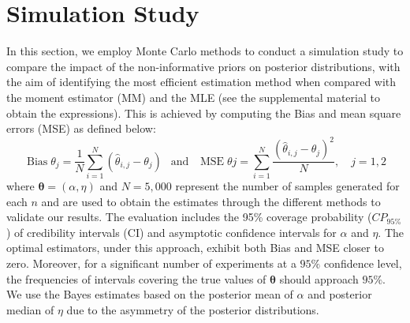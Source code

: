 \documentclass[12pt]{interact}
\newcommand{\f}{\operatorname}
\theoremstyle{plain}%
\theoremstyle{definition}
\theoremstyle{remark}
\begin{document}
\section{Simulation Study}

In this section, we employ Monte Carlo methods to conduct a simulation study to compare the impact of the non-informative priors on posterior distributions, with the aim of identifying the most efficient estimation method when compared with the moment estimator (MM) and the MLE (see the supplemental material to obtain the expressions). This is achieved by computing the Bias and mean square errors (MSE) as defined below:
\begin{equation*}
\f{Bias}{\theta_j}=\frac{1}{N}\sum_{i=1}^{N}(\hat\theta_{i,j}-\theta_j) \ \ \mbox{ and } \ \ \f{MSE}{\theta{j}}=\sum_{i=1}^{N}\frac{(\hat\theta_{i,j}-\theta_{j})^2}{N}, \quad j=1,2\end{equation*}
where $\boldsymbol{\theta}=(\alpha,\eta)$ and $N=5,000$ represent the number of samples generated for each $n$ and are used to obtain the estimates through the different methods to validate our results. The evaluation includes the 95\% coverage probability ($CP_{95\%}$) of credibility intervals (CI) and asymptotic confidence intervals for $\alpha$ and $\eta$. The optimal estimators, under this approach, exhibit both Bias and MSE closer to zero. Moreover, for a significant number of experiments at a $95\%$ confidence level, the frequencies of intervals covering the true values of $\boldsymbol{\theta}$ should approach $95\%$. We use the Bayes estimates based on the posterior mean of $\alpha$ and posterior median of $\eta$ due to the asymmetry of the posterior distributions.
\end{document}
